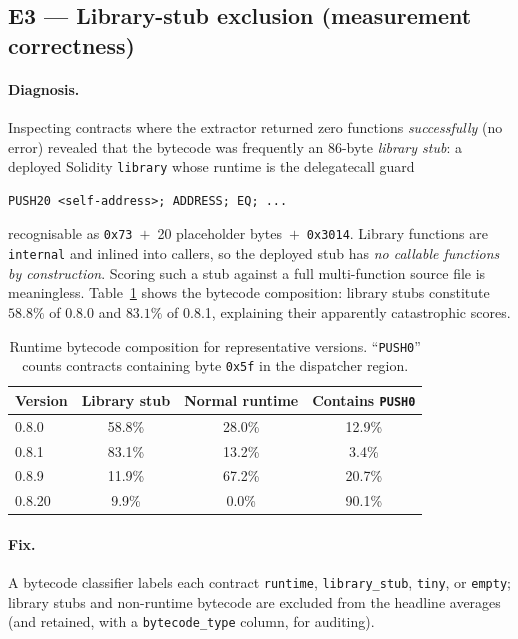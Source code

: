\documentclass[10pt,conference]{article}
\newcommand{\fbyte}[1]{\texttt{0x#1}}
\begin{document}
\subsection{E3 --- Library-stub exclusion (measurement correctness)}
\label{sec:e3}

\paragraph{Diagnosis.}
Inspecting contracts where the extractor returned zero functions
\emph{successfully} (no error) revealed that the bytecode was frequently an
86-byte \emph{library stub}: a deployed Solidity \texttt{library} whose runtime
is the delegatecall guard
\begin{lstlisting}[style=evm]
PUSH20 <self-address>; ADDRESS; EQ; ...
\end{lstlisting}
recognisable as \fbyte{73}~$+$~20 placeholder bytes~$+$~\fbyte{3014}. Library
functions are \texttt{internal} and inlined into callers, so the deployed stub
has \emph{no callable functions by construction}. Scoring such a stub against a
full multi-function source file is meaningless. Table~\ref{tab:composition}
shows the bytecode composition: library stubs constitute $58.8\%$ of 0.8.0 and
$83.1\%$ of 0.8.1, explaining their apparently catastrophic scores.

\begin{table}[t]
\centering
\caption{Runtime bytecode composition for representative versions. ``\texttt{PUSH0}''
counts contracts containing byte \fbyte{5f} in the dispatcher region.}
\label{tab:composition}
\small
\begin{tabular}{l c c c}
\toprule
Version & Library stub & Normal runtime & Contains \texttt{PUSH0} \\
\midrule
0.8.0  & 58.8\% & 28.0\% & 12.9\% \\
0.8.1  & 83.1\% & 13.2\% & 3.4\%  \\
0.8.9  & 11.9\% & 67.2\% & 20.7\% \\
0.8.20 & 9.9\%  & 0.0\%  & 90.1\% \\
\bottomrule
\end{tabular}
\end{table}

\paragraph{Fix.}
A bytecode classifier labels each contract \texttt{runtime},
\texttt{library\_stub}, \texttt{tiny}, or \texttt{empty}; library stubs and
non-runtime bytecode are excluded from the headline averages (and retained, with
a \texttt{bytecode\_type} column, for auditing).
\end{document}
